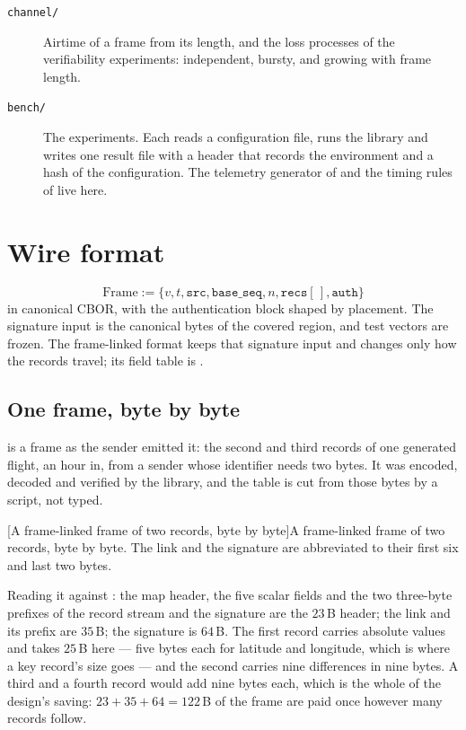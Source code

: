 \begin{description}
\item[\texttt{channel/}] Airtime of a frame from its length, and the loss processes of the
verifiability experiments: independent, bursty, and growing with frame length.

\item[\texttt{bench/}] The experiments. Each reads a configuration file, runs the library and
writes one result file with a header that records the environment and a hash of the
configuration. The telemetry generator of  and the timing rules of
 live here.
\end{description}

\section{Wire format}

\[
\text{Frame} := \{v, t, \texttt{src}, \texttt{base\_seq}, n, \texttt{recs}[\,], \texttt{auth}\}
\]
in canonical CBOR, with the authentication block shaped by placement. The signature input is the
canonical bytes of the covered region, and test vectors are frozen. The frame-linked format keeps that
signature input and changes only how the records travel; its field table is .

\subsection{One frame, byte by byte}\label{sec:worked}

 is a frame as the sender emitted it: the second and third records of one
generated flight, an hour in, from a sender whose identifier needs two bytes. It was encoded,
decoded and verified by the library, and the table is cut from those bytes by a script, not
typed.

\begingroup
\renewcommand{\arraystretch}{0.92}

[A frame-linked frame of two records, byte by byte]{A frame-linked frame of two records, byte
by byte. The link and the signature are abbreviated to their first six and last two bytes.}
\label{tab:worked}
\endgroup

Reading it against : the map header, the five scalar fields and the two
three-byte prefixes of the record stream and the signature are the $23$\,B header; the link and
its prefix are $35$\,B; the signature is $64$\,B. The first record carries absolute values and
takes $25$\,B here --- five bytes each for latitude and longitude, which is where a key record's
size goes --- and the second carries nine differences in nine bytes. A third and a fourth record
would add nine bytes each, which is the whole of the design's saving: $23 + 35 + 64 = 122$\,B
of the frame are paid once however many records follow.

